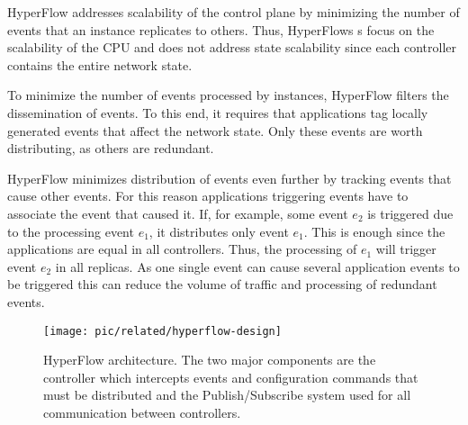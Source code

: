 
HyperFlow addresses scalability of the control plane by minimizing the number of events that an instance replicates to others. 
Thus, HyperFlows s focus on the scalability of the CPU and does not address state scalability since  each controller contains  the entire network state. 

To minimize the number of events  processed by instances, HyperFlow filters the dissemination of events.  
To this end, it requires that applications tag locally generated events that affect the network state.   
Only these events are worth distributing,  as others are redundant. 


HyperFlow minimizes distribution of events even further by tracking events that cause other events. 
For this reason applications triggering events have to  associate the event that caused it. 
If, for example, some event $e_2$ is triggered due to the processing event $e_1$, it  distributes only event $e_1$. 
This is enough since the applications are equal in all controllers. 
Thus,  the processing of $e_1$ will  trigger event $e_2$ in all replicas. 
As one single event can cause several application events to be triggered this can reduce the volume of traffic and processing of redundant events.

\begin{figure}
  \centering 
  \footnotesize
  \texttt{[image: pic/related/hyperflow-design]}
  \caption[HyperFlow architecture]{HyperFlow architecture. The two major components are the controller which intercepts events and configuration commands that must be distributed and the Publish/Subscribe system used for all communication between controllers.} 
  \label{fig:hyperflow-design}
\end{figure}

